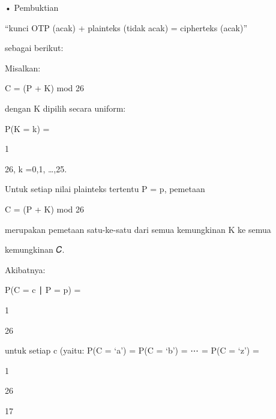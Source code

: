 \documentclass{article}
\begin{document}

• Pembuktian 

            “kunci OTP (acak) + plainteks (tidak  acak) = cipherteks (acak)”

   sebagai berikut:

    Misalkan: 

              C = (P + K) mod 26

  dengan K dipilih secara uniform:  

              P(K = k) = 

1

26​,     k =0,1, …,25.

   Untuk setiap nilai plainteks tertentu P = p, pemetaan

              C = (P + K) mod 26

   merupakan pemetaan satu-ke-satu dari semua kemungkinan K ke semua 

kemungkinan 𝐶.

   Akibatnya:

           P(C = c ∣ P = p) = 

1

26

  untuk setiap c  (yaitu: P(C = ‘a’) = P(C = ‘b’) = ⋯ = P(C = ‘z’) =

1

26

17
\end{document}
